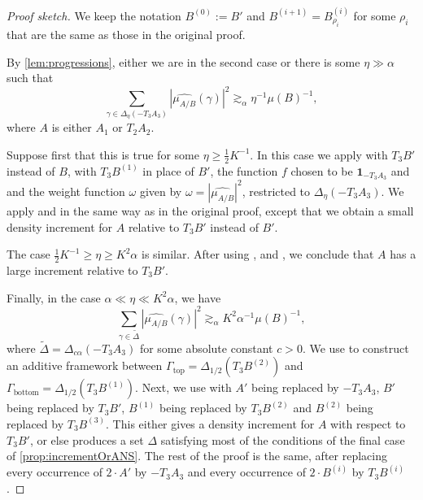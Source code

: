 \documentclass{daj}
\theoremstyle{definition}
\newcommand{\mh}[1]{\widehat{\mu_{#1}}}
\newcommand{\ind}[1]{\mathbf{1}_{#1}}
\newcommand{\geqs}[1]{\gtrsim_{#1}}
\begin{document}
\begin{proof}[Proof sketch]
We keep the notation $B^{(0)} := B'$ and $B^{(i+1)} = B^{(i)}_{\rho_i} $ for some $\rho_i$ that are the same as those in the original proof.

By \cref{lem:progressions}, either we are in the second case or there is some $\eta \gg \alpha$ such that
\begin{equation*}
	\sum_{\gamma \in \Delta_\eta (-T_3A_3)} |\mh{A/B}(\gamma)|^2 \gtrsim_{\alpha} \eta^{-1} \mu(B)^{-1},
\end{equation*}
where $A$ is either $A_1$ or $T_2A_2$.

Suppose first that this is true for some $\eta \geq \tfrac12 K^{-1}$. In this case we apply \cite[Corollary~7.11]{BS} with $T_3B'$ instead of $B$, with $T_3B^{(1)}$ in place of $B'$, the function $f$ chosen to be $\ind{-T_3A_3}$ and  and the weight function $\omega$ given by $\omega = |\mh{A/B}|^2$, restricted to $\Delta_{\eta}(-T_3A_3)$. We apply \cite[Lemma~7.8]{BS} and \cite[Lemma~5.7]{BS} in the same way as in the original proof, except that we obtain a small density increment for $A$ relative to $T_3B'$ instead of $B'$. 

The case $ \tfrac12 K^{-1}\geq \eta \geq K^2\alpha$ is similar. After using \cite[Corollary~7.12]{BS}, \cite[Lemma~7.8]{BS} and \cite[Lemma~5.7]{BS}, we conclude that $A$ has a large increment relative to $T_3B'$.

Finally, in the case $\alpha \ll \eta \ll K^2\alpha$, we have 
\begin{equation*}
\sum_{\gamma \in \tilde{\Delta}} |\mh{A/B}(\gamma)|^2 \geqs{\alpha} K^2\alpha^{-1} \mu(B)^{-1},
\end{equation*}
where $\tilde{\Delta} = \Delta_{c\alpha}(-T_3A_3)$ for some absolute constant $c>0$. We use \cite[Lemma~6.2]{BS} to construct an additive framework between $\Gamma_{\mathrm{top}} = \Delta_{1/2}(T_3B^{(2)})$ and $\Gamma_{\mathrm{bottom}} = \Delta_{1/2}(T_3B^{(1)})$. Next, we use \cite[Lemma~8.5]{BS} with $A'$ being replaced by $-T_3A_3$, $B'$ being replaced by $T_3B'$, $B^{(1)}$ being replaced by $T_3B^{(2)}$ and $B^{(2)}$ being replaced by $T_3B^{(3)}$. This either gives a density increment for $A$ with respect to $T_3B'$, or else produces a set $\Delta$ satisfying most of the conditions of the final case of \cref{prop:incrementOrANS}. The rest of the proof is the same, after replacing every occurrence of $2\cdot A'$ by $-T_3A_3$ and every occurrence of $2\cdot B^{(i)}$ by $T_3B^{(i)}$.
\end{proof}
\end{document}
